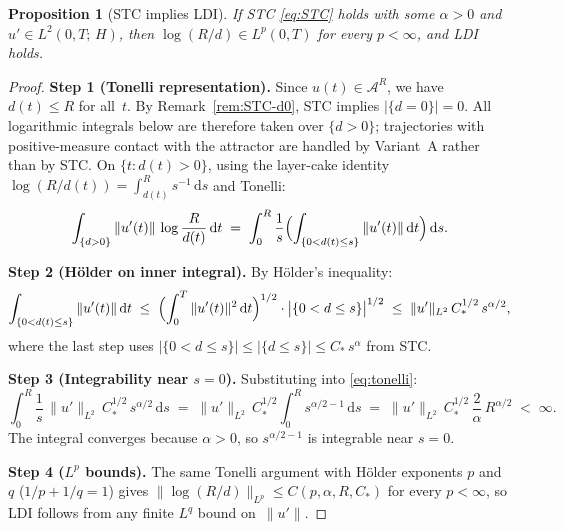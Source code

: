 \documentclass[12pt,a4paper]{article}
\theoremstyle{definition}
\theoremstyle{plain}
\newtheorem{proposition}[definition]{Proposition}
\theoremstyle{remark}
\begin{document}
\begin{proposition}[STC implies LDI]
\label{prop:variant-B}
If STC \eqref{eq:STC} holds with some $\alpha > 0$ and
$u' \in L^2(0,T;\,H)$, then
$\log(R/d) \in L^p(0,T)$ for every $p < \infty$, and LDI holds.
\end{proposition}

\begin{proof}
\textbf{Step 1 (Tonelli representation).}\;
Since $u(t) \in \mathcal{A}^R$, we have $d(t) \le R$ for all~$t$.
By Remark~\ref{rem:STC-d0}, STC implies $|\{d=0\}|=0$.
All logarithmic integrals below are therefore taken over $\{d>0\}$;
trajectories with positive-measure contact with the attractor are handled
by Variant~A rather than by STC.  On $\{t : d(t) > 0\}$, using the
layer-cake identity
$\log(R/d(t)) = \int_{d(t)}^{R} s^{-1}\,\mathrm{d}s$ and Tonelli:
\begin{equation}\label{eq:tonelli}
  \int_{\{d>0\}} \|u'(t)\|\,\log\frac{R}{d(t)}\,\mathrm{d}t
  \;=\;
  \int_0^R \frac{1}{s}
  \Bigl(\int_{\{0 < d(t) \le s\}} \|u'(t)\|\,\mathrm{d}t\Bigr)
  \,\mathrm{d}s.
\end{equation}

\medskip
\noindent
\textbf{Step 2 (Hölder on inner integral).}\;
By Hölder's inequality:
\[
  \int_{\{0<d(t)\le s\}} \|u'(t)\|\,\mathrm{d}t
  \;\le\;
  \Bigl(\int_0^T \|u'(t)\|^2\,\mathrm{d}t\Bigr)^{1/2}
  \cdot
  \bigl|\{0 < d \le s\}\bigr|^{1/2}
  \;\le\;
  \|u'\|_{L^2}\,C_*^{1/2}\,s^{\alpha/2},
\]
where the last step uses $|\{0<d\le s\}| \le |\{d\le s\}|
\le C_*\,s^\alpha$ from STC.

\medskip
\noindent
\textbf{Step 3 (Integrability near $s=0$).}\;
Substituting into \eqref{eq:tonelli}:
\[
  \int_0^R \frac{1}{s}\,\|u'\|_{L^2}\,C_*^{1/2}\,s^{\alpha/2}
  \,\mathrm{d}s
  \;=\;
  \|u'\|_{L^2}\,C_*^{1/2}
  \int_0^R s^{\alpha/2 - 1}\,\mathrm{d}s
  \;=\;
  \|u'\|_{L^2}\,C_*^{1/2}\,
  \frac{2}{\alpha}\,R^{\alpha/2}
  \;<\; \infty.
\]
The integral converges because $\alpha > 0$, so
$s^{\alpha/2-1}$ is integrable near $s=0$.

\medskip
\noindent
\textbf{Step 4 ($L^p$ bounds).}\;
The same Tonelli argument with Hölder exponents $p$ and $q$
($1/p + 1/q = 1$) gives
$\|\log(R/d)\|_{L^p} \le C(p,\alpha,R,C_*)$ for every
$p < \infty$, so LDI follows from any finite $L^q$ bound
on~$\|u'\|$.
\end{proof}
\end{document}
